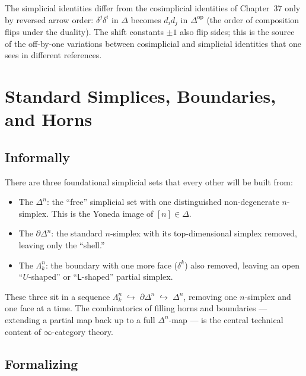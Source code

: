 \begin{remark}
The simplicial identities differ from the cosimplicial identities of
Chapter~37 only by reversed arrow order: $\delta^j \delta^i$ in $\Delta$
becomes $d_i d_j$ in $\Delta^{\mathrm{op}}$ (the order of composition flips
under the duality). The shift constants $\pm 1$ also flip sides; this is
the source of the off-by-one variations between cosimplicial and simplicial
identities that one sees in different references.
\end{remark}


\section{Standard Simplices, Boundaries, and Horns}
\label{sec:simplices-boundaries-horns}

\subsection{Informally}

There are three foundational simplicial sets that every other will be
built from:
\begin{itemize}
  \item The  $\Delta^n$: the ``free'' simplicial
        set with one distinguished non-degenerate $n$-simplex. This is
        the Yoneda image of $[n] \in \Delta$.
  \item The  $\partial\Delta^n$: the standard $n$-simplex
        with its top-dimensional simplex removed, leaving only the
        ``shell.''
  \item The  $\Lambda^n_k$: the boundary with one more face
        ($\delta^k$) also removed, leaving an open ``$U$-shaped'' or
        ``$\mathsf{L}$-shaped'' partial simplex.
\end{itemize}
These three sit in a sequence
$\Lambda^n_k \;\hookrightarrow\; \partial\Delta^n \;\hookrightarrow\; \Delta^n$,
removing one $n$-simplex and one face at a time. The combinatorics of
filling horns and boundaries — extending a partial map back up to a
full $\Delta^n$-map — is the central technical content of
$\infty$-category theory.

\subsection{Formalizing}

